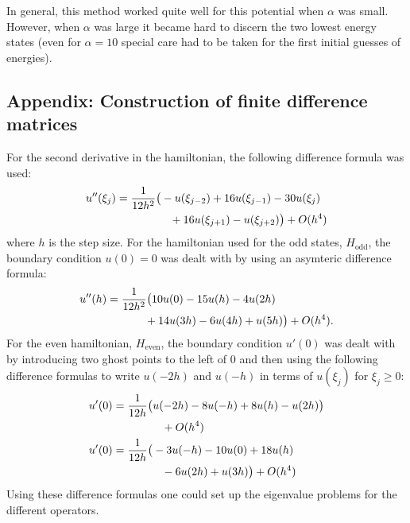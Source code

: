\documentclass[twocolumn]{article}
\begin{document}
\begin{large}
In general, this method worked quite well for this potential when $\alpha$ was small. However, when $\alpha$ was large it became hard to discern the two lowest energy states (even for $\alpha=10$ special care had to be taken for the first initial guesses of energies).
\subsection*{Appendix: Construction of finite difference matrices}
For the second derivative in the hamiltonian, the following difference formula was used:
\begin{equation}
    \begin{split}
        u''(\xi_j) &= \frac{1}{12h^2}\big(-u(\xi_{j-2})+16u(\xi_{j-1})-30u(\xi_j) \\ 
        &\hspace{1.7cm}+16u(\xi_{j+1})-u(\xi_{j+2})\big) + O(h^4)
    \end{split}
\end{equation}
where $h$ is the step size.
For the hamiltonian used for the odd states, $H_\text{odd}$, the boundary condition $u(0)=0$ was dealt with by using an asymteric difference formula:
\begin{equation}
    \begin{split}
    u''(h) &= \frac{1}{12h^2}\big(10u(0)-15u(h)-4u(2h) \\
    &\hspace{1.2cm} +14u(3h)-6u(4h)+u(5h)\big) + O(h^4).
    \end{split}
\end{equation}
For the even hamiltonian, $H_\text{even}$, the boundary condition $u'(0)$ was dealt with by introducing two ghost points to the left of $0$ and then using the following difference formulas to write $u(-2h)$ and $u(-h)$ in terms of $u(\xi_j)$ for $\xi_j\geq 0$:
\begin{equation}
    \begin{split}
        &u'(0) = \frac{1}{12h}\big(u(-2h)-8u(-h)+8u(h)-u(2h)\big) \\ 
        &\hspace{2.3cm} +O(h^4) \\ 
        &u'(0) = \frac{1}{12h}\big(-3u(-h)-10u(0)+18u(h) \\ 
        &\hspace{2.3cm} -6u(2h)+u(3h)\big)+O(h^4)
    \end{split}
\end{equation}
Using these difference formulas one could set up the eigenvalue problems for the different operators. 
\end{large}
\end{document}
